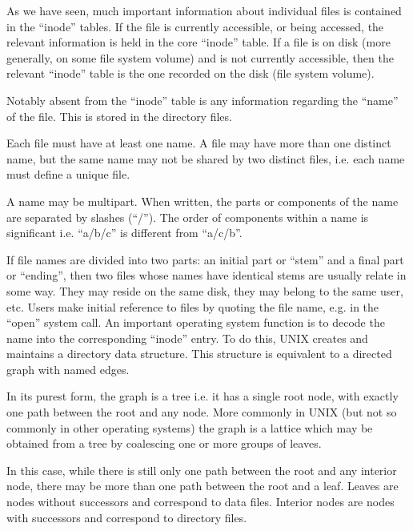 %
%

As we have seen, much important  information  about
individual files is contained in the ``inode'' tables.   If  the
file  is currently accessible, or being
accessed, the relevant  information  is
held  in  the core ``inode'' table.  If a
file is on  disk  (more  generally,  on
some  file  system volume) and is not
currently accessible, then the relevant
``inode''  table  is  the one recorded on
the disk (file system volume).


Notably absent from the  ``inode''  table
is any information regarding the ``name''
of the file.  This  is  stored  in  the
directory files.


Each file must have at least one  name.
A file may have more than one  distinct
name, but the  same  name  may  not  be
shared  by  two  distinct  files,  i.e.
each name must define a unique file.


A name may be multipart.  When written,
the parts or components of the name are
separated by slashes (``/'').  The  order
of components within a name is significant i.e. 
``a/b/c''  is  different  from ``a/c/b''.

If file  names  are  divided  into  two
parts:  an initial part or ``stem'' and a
final part or ``ending'', then two  files
whose  names  have  identical stems are
usually relate in some way.  They  may
reside  on  the  same  disk,  they  may
belong to the same user, etc.
Users make initial reference  to  files
by  quoting  the file name, e.g. in the
``open''  system  call.    An   important
operating  system function is to decode
the name into the corresponding ``inode''
entry.   To  do  this, UNIX creates and
maintains a directory  data  structure.
This   structure  is  equivalent  to  a
directed graph with named edges.


In its purest form, the graph is a tree
i.e.  it  has  a single root node, with
exactly one path between the  root  and
any  node.  More  commonly in UNIX (but
not so commonly in other operating systems) the graph is a lattice  which may
be obtained from a tree  by  coalescing
one or more groups of leaves.

In this case, while there is still only
one path between the root and any interior node, there may be more  than  one
path  between  the  root  and  a  leaf.
Leaves are nodes without successors and
correspond to  data  files.  Interior
nodes are  nodes  with  successors  and
correspond to directory files.

